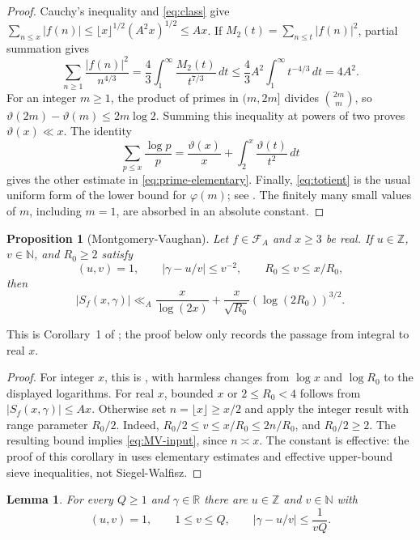 \documentclass[11pt]{amsart}
\numberwithin{equation}{section}
\numberwithin{figure}{section}
\newtheorem{lemma}{Lemma}[section]
\newtheorem{proposition}{Proposition}[section]
\theoremstyle{definition}
\newcommand{\Z}{\mathbb{Z}}
\newcommand{\R}{\mathbb{R}}
\newcommand{\N}{\mathbb{N}}
\newcommand{\FA}{\mathcal F_A}
\begin{document}
\begin{proof}
Cauchy's inequality and \eqref{eq:class} give
$\sum_{n\le x}|f(n)|\le \lfloor x\rfloor^{1/2}(A^2x)^{1/2}\le Ax$.
If $M_2(t)=\sum_{n\le t}|f(n)|^2$, partial summation gives
\[
 \sum_{n\ge1}\frac{|f(n)|^2}{n^{4/3}}
 =\frac43\int_1^\infty \frac{M_2(t)}{t^{7/3}}\,dt
 \le\frac43 A^2\int_1^\infty t^{-4/3}\,dt=4A^2.
\]
For an integer $m\ge1$, the product of primes in $(m,2m]$ divides
$\binom{2m}{m}$, so
$\vartheta(2m)-\vartheta(m)\le2m\log2$.
Summing this inequality at powers of two proves $\vartheta(x)\ll x$.
The identity
\[
 \sum_{p\le x}\frac{\log p}{p}
 =\frac{\vartheta(x)}x+\int_2^x\frac{\vartheta(t)}{t^2}\,dt
\]
gives the other estimate in \eqref{eq:prime-elementary}.
Finally, \eqref{eq:totient} is the usual uniform form of the lower bound
for $\varphi(m)$; see \cite[Corollary~3.6]{Kouk}. The finitely many small
values of $m$, including $m=1$, are absorbed in an absolute constant.
\end{proof}

\begin{proposition}[Montgomery-Vaughan]\label{prop:MV}
Let $f\in\FA$ and $x\ge3$ be real. If $u\in\Z$, $v\in\N$, and $R_0\ge2$
satisfy
\[
 (u,v)=1,\qquad |\gamma-u/v|\le v^{-2},\qquad
 R_0\le v\le x/R_0,
\]
then
\begin{equation}\label{eq:MV-input}
 |S_f(x,\gamma)|\ll_A
 \frac{x}{\log(2x)}+
 \frac{x}{\sqrt{R_0}}(\log(2R_0))^{3/2}.
\end{equation}
\end{proposition}

This is Corollary~1 of \cite{MV}; the proof below only records the
passage from integral to real $x$.

\begin{proof}
For integer $x$, this is \cite[Corollary~1, p.~70]{MV}, with harmless
changes from $\log x$ and $\log R_0$ to the displayed logarithms.
For real $x$, bounded $x$ or $2\le R_0<4$ follows from
$|S_f(x,\gamma)|\le Ax$.
Otherwise set $n=\lfloor x\rfloor\ge x/2$ and apply the integer result
with range parameter $R_0/2$. Indeed,
$R_0/2\le v\le x/R_0\le2n/R_0$, and $R_0/2\ge2$.
The resulting bound implies \eqref{eq:MV-input}, since $n\asymp x$.
The constant is effective: the proof of this corollary in
\cite[Sections~2-6]{MV} uses elementary estimates and effective
upper-bound sieve inequalities, not Siegel-Walfisz.
\end{proof}

\begin{lemma}\label{lem:dirichlet}
For every $Q\ge1$ and $\gamma\in\R$ there are $u\in\Z$ and $v\in\N$ with
\[
 (u,v)=1,\qquad 1\le v\le Q,\qquad
 |\gamma-u/v|\le\frac1{vQ}.
\]
\end{lemma}
\end{document}

